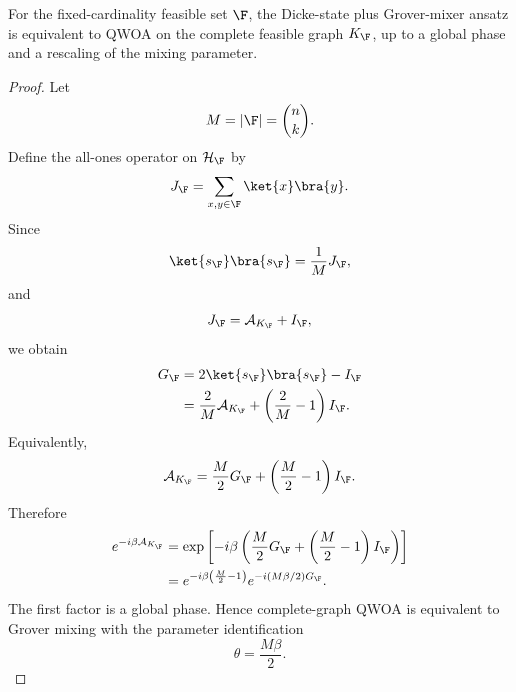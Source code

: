 \begin{proposition}
\label{prop:grover-complete-qwoa}
For the fixed-cardinality feasible set $\F$, the Dicke-state plus Grover-mixer
ansatz is equivalent to QWOA on the complete feasible graph $K_{\F}$, up to a
global phase and a rescaling of the mixing parameter.
\end{proposition}

\begin{proof}
 Let
\begin{equation}
    M=|\F|=\binom{n}{k}.
\end{equation}
Define the all-ones operator on $\mathcal{H}_{\F}$ by
\begin{equation}
    J_{\F}=\sum_{x,y\in\F}\ket{x}\bra{y}.
\end{equation}
Since
\begin{equation}
    \ket{s_{\F}}\bra{s_{\F}}=\frac{1}{M}J_{\F},
\end{equation}
and
\begin{equation}
    J_{\F}=\mathcal{A}_{K_{\F}}+I_{\F},
\end{equation}
we obtain
\begin{align}
    G_{\F}
    &=
    2\ket{s_{\F}}\bra{s_{\F}}-I_{\F}
    \nonumber\\
    &=
    \frac{2}{M}\mathcal{A}_{K_{\F}}
    +
    \left(\frac{2}{M}-1\right)I_{\F}.
    \label{eq:grover-complete-relation}
\end{align}
Equivalently,
\begin{equation}
    \mathcal{A}_{K_{\F}}
    =
    \frac{M}{2}G_{\F}
    +
    \left(\frac{M}{2}-1\right)I_{\F}.
    \label{eq:complete-grover-relation}
\end{equation}
Therefore
\begin{align}
    e^{-i\beta \mathcal{A}_{K_{\F}}}
    &=
    \exp\left[
    -i\beta
    \left(
    \frac{M}{2}G_{\F}
    +
    \left(\frac{M}{2}-1\right)I_{\F}
    \right)
    \right]
    \nonumber\\
    &=
    e^{-i\beta\left(\frac{M}{2}-1\right)}
    e^{-i(M\beta/2)G_{\F}}.
    \label{eq:qwoa-grover-equivalence}
\end{align}
The first factor is a global phase. Hence complete-graph QWOA is equivalent to
Grover mixing with the parameter identification
\begin{equation}
    \theta=\frac{M\beta}{2}.
\end{equation}

\end{proof}

